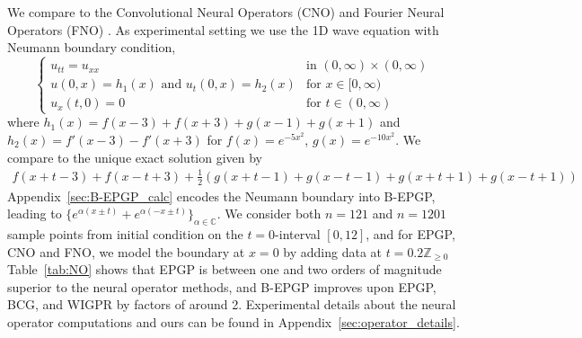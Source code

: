 \documentclass{article} %
\theoremstyle{plain}
\theoremstyle{definition}
\theoremstyle{remark}
\newcommand{\CC}{\mathbb{C}}
\newcommand{\ZZ}{\mathbb{Z}}
\begin{document}
We compare to the Convolutional Neural Operators (CNO) \citep{raonic2024convolutional} and Fourier Neural Operators (FNO) \citep{Li2021}.
As experimental setting we use the
1D wave equation with Neumann boundary condition,
$$
\begin{cases}
u_{tt}=u_{xx} &\text{in \((0,\infty)\times(0,\infty)\)}\\
u(0,x) = h_1(x)\text{ and }u_t(0,x)=h_2(x) &\text{for \(x\in[0,\infty)\)}\\
 u_x(t,0)=0 &\text{for \(t\in(0,\infty)\)}
\end{cases}
$$
where $h_1(x)=f(x-3)+f(x+3) +g(x-1)+g(x+1)$ and $h_2(x)=f'(x-3)-f'(x+3)$ for \(f(x)=e^{-5x^2}\), \(g(x)=e^{-10x^2}\).
We compare to the unique exact solution given by
\begin{align*}
    f(x+t-3)+f(x-t+3) +\tfrac 1 2\left( g(x+t-1)+g(x-t-1)+ g(x+t+1)+g(x-t+1)\right)
\end{align*}
Appendix~\ref{sec:B-EPGP_calc} encodes the Neumann boundary into  B-EPGP, leading to
$
\{e^{\alpha (x\pm t)}+e^{\alpha (-x\pm t)}\}_{\alpha\in\CC}.
$
We consider both \(n=121\) and \(n=1201\) sample points from initial condition on the $t=0$-interval \([0,12]\), and for EPGP, CNO and FNO, we model the boundary at $x=0$ by adding data at \(t=0.2\ZZ_{\ge0}\)
Table~\ref{tab:NO} shows that EPGP is between one and two orders of magnitude superior to the neural operator methods, and B-EPGP improves upon EPGP, BCG, and WIGPR by factors of around 2.
Experimental details about the  neural operator computations and ours can be found in Appendix~\ref{sec:operator_details}.
\end{document}
